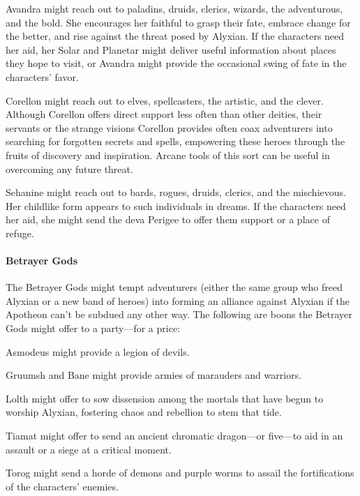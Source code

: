 \documentclass[10pt,a4paper,twoside,twocolumn,openany,nodeprecatedcode]{dndbook}
\begin{document}
\begin{description}[nolistsep]
\item[Avandra the Change Bringer.]
Avandra might reach out to paladins, druids, clerics, wizards, the adventurous, and the bold. She encourages her faithful to grasp their fate, embrace change for the better, and rise against the threat posed by Alyxian. If the characters need her aid, her Solar and Planetar might deliver useful information about places they hope to visit, or Avandra might provide the occasional swing of fate in the characters' favor.
\item[Corellon the Arch Heart.]
Corellon might reach out to elves, spellcasters, the artistic, and the clever. Although Corellon offers direct support less often than other deities, their servants or the strange visions Corellon provides often coax adventurers into searching for forgotten secrets and spells, empowering these heroes through the fruits of discovery and inspiration. Arcane tools of this sort can be useful in overcoming any future threat.
\item[Sehanine the Moon Weaver.]
Sehanine might reach out to bards, rogues, druids, clerics, and the mischievous. Her childlike form appears to such individuals in dreams. If the characters need her aid, she might send the deva Perigee to offer them support or a place of refuge.
\end{description}

\paragraph{Betrayer Gods}
The Betrayer Gods might tempt adventurers (either the same group who freed Alyxian or a new band of heroes) into forming an alliance against Alyxian if the Apotheon can't be subdued any other way. The following are boons the Betrayer Gods might offer to a party—for a price:

Asmodeus might provide a legion of devils.

Gruumsh and Bane might provide armies of marauders and warriors.

Lolth might offer to sow dissension among the mortals that have begun to worship Alyxian, fostering chaos and rebellion to stem that tide.

Tiamat might offer to send an ancient chromatic dragon—or five—to aid in an assault or a siege at a critical moment.

Torog might send a horde of demons and purple worms to assail the fortifications of the characters' enemies.
\end{document}

